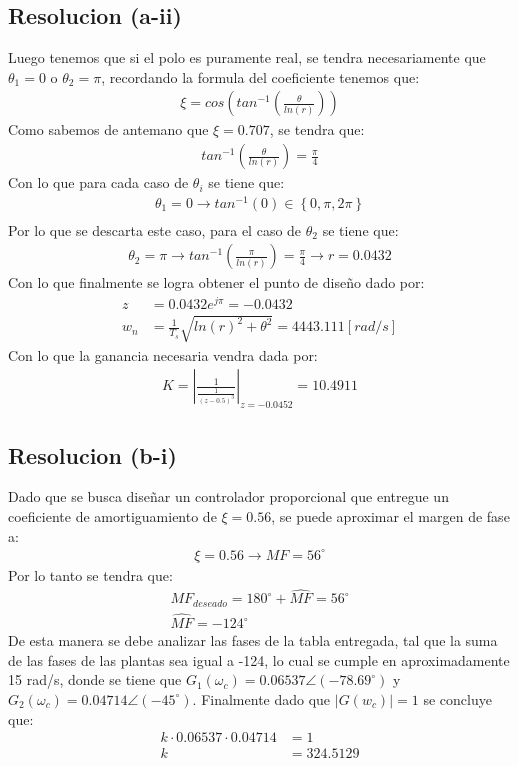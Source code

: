 \documentclass[
  11pt,
  letterpaper,
   addpoints,
   answers
  ]{exam}
\begin{document}
\begin{questions}
\begin{solution}
\subsection*{Resolucion (a-ii)}
Luego tenemos que si el polo es puramente real, se tendra necesariamente que $\theta_{1} = 0$ o $\theta_{2}= \pi$, recordando la formula del coeficiente tenemos que:
\begin{align}
    \xi = cos\left( tan^{-1} \left(\frac{\theta}{ln(r)}\right)\right)
\end{align}
Como sabemos de antemano que $\xi = 0.707$, se tendra que:
\begin{align}
    tan^{-1}\left(\frac{\theta}{ln(r)}\right) = \frac{\pi}{4}
\end{align}
Con lo que para cada caso de $\theta_{i}$ se tiene que:
\begin{align}
    \theta_{1} = 0 \rightarrow tan^{-1}(0)\in \left\{0, \pi , 2\pi \right\}\\
\end{align}
Por lo que se descarta este caso, para el caso de $\theta_{2}$ se tiene que:
\begin{align}
    \theta_{2} = \pi \rightarrow tan^{-1}\left(\frac{\pi}{ln(r)}\right)= \frac{\pi}{4} \rightarrow r = 0.0432
\end{align}
Con lo que finalmente se logra obtener el punto de diseño dado por:
\begin{align}
    z&= 0.0432 e^{j \pi} = -0.0432\\
    w_{n} &= \frac{1}{T_{s}} \sqrt{ln(r)^{2}+\theta^{2}} = 4443.111[rad/s]
\end{align}
Con lo que la ganancia necesaria vendra dada por:
\begin{align}
    K = \left| \frac{1}{\frac{1}{(z-0.5)^{3}}}\right|_{z=-0.0452} = 10.4911
\end{align}
\subsection*{Resolucion (b-i)}
Dado que se busca diseñar un controlador proporcional que entregue un coeficiente de amortiguamiento de $\xi = 0.56$, se puede aproximar el margen de fase a:
\begin{align}
    \xi = 0.56 \rightarrow MF = 56^{\circ}
\end{align}
Por lo tanto se tendra que:
\begin{align}
    MF_{deseado} = 180^{\circ} + \hat{MF} = 56^{\circ}\\
    \hat{MF} = -124^{\circ}
\end{align}
De esta manera se debe analizar las fases de la tabla entregada, tal que la suma de las fases de las plantas sea igual a -124, lo cual se cumple en aproximadamente 15 rad/s, donde se tiene que  $G_{1}(\omega_{c}) = 0.06537\angle(-78.69^{\circ} )$ y $G_{2}(\omega_{c}) = 0.04714\angle(-45^{\circ} )$. Finalmente dado que $|G(w_{c})|=1$ se concluye que:
\begin{align}
    k \cdot 0.06537 \cdot 0.04714 &= 1\\
    k &= 324.5129
\end{align}

\end{solution}
\end{questions}
\end{document}
